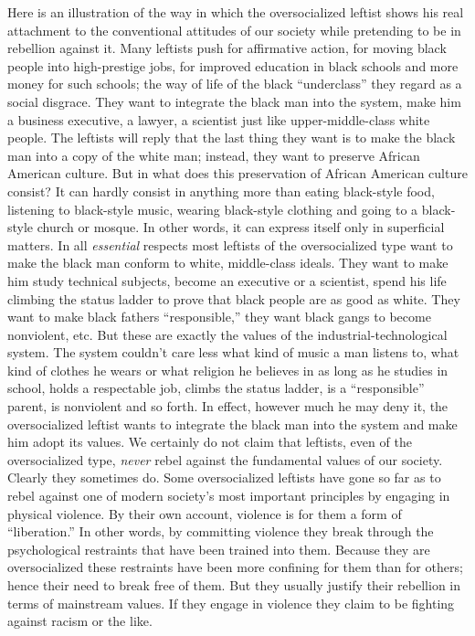  Here is an illustration of the way in which the oversocialized leftist shows his real attachment to the conventional attitudes of our society while pretending to be in rebellion against it. Many leftists push for affirmative action, for moving black people into high-prestige jobs, for improved education in black schools and more money for such schools; the way of life of the black “underclass” they regard as a social disgrace. They want to integrate the black man into the system, make him a business executive, a lawyer, a scientist just like upper-middle-class white people. The leftists will reply that the last thing they want is to make the black man into a copy of the white man; instead, they want to preserve African American culture. But in what does this preservation of African American culture consist? It can hardly consist in anything more than eating black-style food, listening to black-style music, wearing black-style clothing and going to a black- style church or mosque. In other words, it can express itself only in superficial matters. In all {\em essential} respects most leftists of the oversocialized type want to make the black man conform to white, middle-class ideals. They want to make him study technical subjects, become an executive or a scientist, spend his life climbing the status ladder to prove that black people are as good as white. They want to make black fathers “responsible,” they want black gangs to become nonviolent, etc. But these are exactly the values of the industrial-technological system. The system couldn’t care less what kind of music a man listens to, what kind of clothes he wears or what religion he believes in as long as he studies in school, holds a respectable job, climbs the status ladder, is a “responsible” parent, is nonviolent and so forth. In effect, however much he may deny it, the oversocialized leftist wants to integrate the black man into the system and make him adopt its values.
 We certainly do not claim that leftists, even of the oversocialized type, {\em never} rebel against the fundamental values of our society. Clearly they sometimes do. Some oversocialized leftists have gone so far as to rebel against one of modern society’s most important principles by engaging in physical violence. By their own account, violence is for them a form of “liberation.” In other words, by committing violence they break through the psychological restraints that have been trained into them. Because they are oversocialized these restraints have been more confining for them than for others; hence their need to break free of them. But they usually justify their rebellion in terms of mainstream values. If they engage in violence they claim to be fighting against racism or the like.
